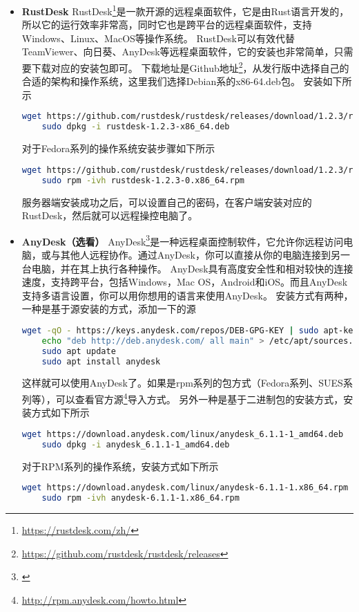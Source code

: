 \documentclass[lang=cn,a4paper,newtx]{elegantpaper}
\begin{document}
\begin{itemize}
  \item \textbf{RustDesk}
  RustDesk\footnote{\url{https://rustdesk.com/zh/}}是一款开源的远程桌面软件，它是由Rust语言开发的，所以它的运行效率非常高，同时它也是跨平台的远程桌面软件，支持Windows、Linux、MacOS等操作系统。
  RustDesk可以有效代替TeamViewer、向日葵、AnyDesk等远程桌面软件，它的安装也非常简单，只需要下载对应的安装包即可。
  下载地址是Github地址\footnote{\url{https://github.com/rustdesk/rustdesk/releases}}，从发行版中选择自己的合适的架构和操作系统，这里我们选择Debian系的x86-64.deb包。
  安装如下所示
  \begin{lstlisting}[language=bash]
    wget https://github.com/rustdesk/rustdesk/releases/download/1.2.3/rustdesk-1.2.3-x86_64.deb
    sudo dpkg -i rustdesk-1.2.3-x86_64.deb
  \end{lstlisting}
  
  对于Fedora系列的操作系统安装步骤如下所示
  \begin{lstlisting}[language=bash]
    wget https://github.com/rustdesk/rustdesk/releases/download/1.2.3/rustdesk-1.2.3-0.x86_64.rpm
    sudo rpm -ivh rustdesk-1.2.3-0.x86_64.rpm
  \end{lstlisting}
  服务器端安装成功之后，可以设置自己的密码，在客户端安装对应的RustDesk，然后就可以远程操控电脑了。
  \item \textbf{AnyDesk（选看）}
  AnyDesk\footnote{\url{}}是一种远程桌面控制软件，它允许你远程访问电脑，或与其他人远程协作。通过AnyDesk，你可以直接从你的电脑连接到另一台电脑，并在其上执行各种操作。
  AnyDesk具有高度安全性和相对较快的连接速度，支持跨平台，包括Windows，Mac OS，Android和iOS。而且AnyDesk支持多语言设置，你可以用你想用的语言来使用AnyDesk。
  安装方式有两种，一种是基于源安装的方式，添加一下的源
  \begin{lstlisting}[language=bash]
    wget -qO - https://keys.anydesk.com/repos/DEB-GPG-KEY | sudo apt-key add -
    echo "deb http://deb.anydesk.com/ all main" > /etc/apt/sources.list.d/anydesk-stable.list
    sudo apt update
    sudo apt install anydesk
  \end{lstlisting}
  这样就可以使用AnyDesk了。如果是rpm系列的包方式（Fedora系列、SUES系列等），可以查看官方源\footnote{\url{http://rpm.anydesk.com/howto.html}}导入方式。
  另外一种是基于二进制包的安装方式，安装方式如下所示
  \begin{lstlisting}[language=bash]
    wget https://download.anydesk.com/linux/anydesk_6.1.1-1_amd64.deb
    sudo dpkg -i anydesk_6.1.1-1_amd64.deb
  \end{lstlisting}
  对于RPM系列的操作系统，安装方式如下所示
  \begin{lstlisting}[language=bash]
    wget https://download.anydesk.com/linux/anydesk-6.1.1-1.x86_64.rpm
    sudo rpm -ivh anydesk-6.1.1-1.x86_64.rpm
  \end{lstlisting}
  \end{itemize}
\end{document}
